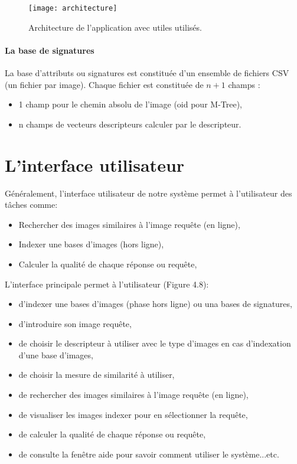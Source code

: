 \begin{figure}[H]
	\centering
	\texttt{[image: architecture]} 
	\caption{Architecture de l’application avec utiles utilisés.}
\end{figure}
\paragraph{La base de signatures}
La base d’attributs ou signatures est constituée d’un ensemble de fichiers CSV (un fichier par image). Chaque fichier est constituée de $ n+1 $ champs :
\begin{itemize}
	\item 1 champ pour le chemin absolu de l'image (oid pour M-Tree),
	\item n champs de vecteurs descripteurs calculer par le descripteur.
\end{itemize}
\section{L’interface utilisateur }
Généralement, l'interface utilisateur de notre système permet à l'utilisateur des tâches comme:
 \begin{itemize}
 	\item Rechercher des images similaires à l'image requête (en ligne),
 	\item Indexer une bases d'images (hors ligne),
 	\item Calculer la qualité de chaque réponse ou requête,
 \end{itemize}

L'interface principale permet à l’utilisateur (Figure 4.8): 
\begin{itemize}
	\item d'indexer une bases d'images (phase hors ligne) ou una bases de signatures,
	\item d’introduire son image requête,
	\item de choisir le descripteur à utiliser avec le type d'images en cas d'indexation d'une base d'images,
	\item de choisir la mesure de similarité à utiliser,
	\item de rechercher des images similaires à l'image requête (en ligne),
	\item de visualiser les images indexer pour en sélectionner la requête,
	\item de calculer la qualité de chaque réponse ou requête,
	\item de consulte la fenêtre aide pour savoir comment utiliser le système...etc.
\end{itemize}

